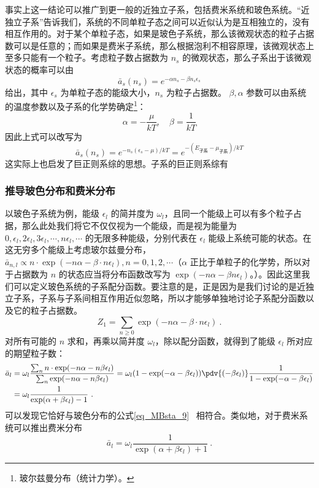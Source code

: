 事实上这一结论可以推广到更一般的近独立子系，包括费米系统和玻色系统。“近独立子系”告诉我们，系统的不同单粒子态之间可以近似认为是互相独立的，没有相互作用的。对于某个单粒子态，如果是玻色子系统，那么该微观状态的粒子占据数可以是任意的；而如果是费米子系统，那么根据泡利不相容原理，该微观状态上至多只能有一个粒子。考虑粒子数占据数为 $n_s$ 的微观状态，那么子系出于该微观状态的概率可以由 
\begin{equation}
\bar a_s(n_s) =  e^{-\alpha n_s-\beta n_s \epsilon_s}
\end{equation}
给出，其中 $\epsilon_s$ 为单粒子态的能级大小，$n_s$ 为粒子占据数。
$\beta,\alpha$ 参数可以由系统的温度参数以及子系的化学势确定\footnote{玻尔兹曼分布（统计力学）。}：
\begin{equation}
\alpha=-\frac{\mu}{kT},\quad \beta=\frac{1}{kT}
\end{equation}
因此上式可以改写为
\begin{equation}
\bar a_s(n_s)= e^{-n_s(\epsilon_s-\mu)/kT}= e^{-(E_\text{子系}-\mu_\text{子系})/kT}
\end{equation}
这实际上也启发了巨正则系综的思想。子系的巨正则系综有

\subsubsection{推导玻色分布和费米分布}
以玻色子系统为例，能级 $\epsilon_l$ 的简并度为 $\omega_l$，且同一个能级上可以有多个粒子占据，那么此处我们将它不仅仅视为一个能级，而是视为能量为 $0,\epsilon_l,2\epsilon_l,3\epsilon_l,\cdots, n\epsilon_l,\cdots$ 的无限多种能级，分别代表在 $\epsilon_l$ 能级上系统可能的状态。在这无穷多个能级上考虑玻尔兹曼分布，$\bar{a}_{n,l} \propto n\cdot \exp(-n\alpha-\beta\cdot n\epsilon_l),n=0,1,2,\cdots $（$\alpha$ 正比于单粒子的化学势，所以对于占据数为 $n$ 的状态应当将分布函数改写为 $\exp(-n\alpha-\beta n\epsilon_l)$。）。因此这里我们可以定义玻色系统的子系配分函数。要注意的是，正是因为是我们讨论的是近独立子系，子系与子系间相互作用近似忽略，所以才能够单独地讨论子系配分函数以及它的粒子占据数。
\begin{equation}
Z_1=\sum_{n\ge 0} \exp(-n\alpha-\beta\cdot n\epsilon_l)~.
\end{equation}
对所有可能的 $n$ 求和，再乘以简并度 $\omega_l$，除以配分函数，就得到了能级 $\epsilon_l$ 所对应的期望粒子数：
\begin{equation}
\begin{aligned}
\bar a_l&=\omega_l \frac{\sum_n n\cdot \exp(-n\alpha-n\beta\epsilon_l)}{\sum_n \exp(-n\alpha-n\beta\epsilon_l)}=\omega_l (1-\exp(-\alpha-\beta\epsilon_l)) \pdv{(-\beta\epsilon_l)} \frac{1}{1-\exp(-\alpha-\beta\epsilon_l)}\\
&=\omega_l \frac{1}{\exp(\alpha+\beta\epsilon_l)-1}~.
\end{aligned}
\end{equation}
可以发现它恰好与玻色分布的公式\autoref{eq_MBsta_9}~ 相符合。类似地，对于费米系统可以推出费米分布
\begin{equation}
\bar a_l=\omega_l \frac{1}{\exp(\alpha+\beta\epsilon_l)+1}~.
\end{equation}
